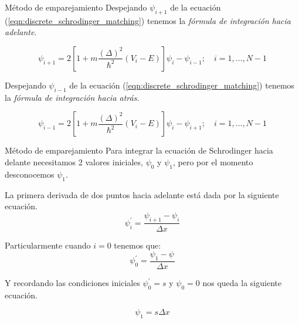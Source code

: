 \begin{frame}{Método de emparejamiento}
    Despejando $\psi_{i+1}$ de la ecuación (\ref{eqn:discrete_schrodinger_matching}) tenemos la \emph{fórmula de integración hacia adelante}.

    \begin{equation}
        \psi_{i+1}
        =
        2\left[
            1+ m\frac{(\Delta)^2}{\hbar^2} (V_i - E) 
        \right] \psi_i - \psi_{i-1}
        ;\quad
        i= 1,...,N-1
        \label{eqn:integracion_adelante_matching}
    \end{equation}

    Despejando $\psi_{i-1}$ de la ecuación (\ref{eqn:discrete_schrodinger_matching}) tenemos la \emph{fórmula de integración hacia atrás}.

    \begin{equation}
        \psi_{i-1}
        =
        2\left[
            1+ m\frac{(\Delta)^2}{\hbar^2} (V_i - E) 
        \right] \psi_i - \psi_{i+1}
        ;\quad
        i= 1,...,N-1
        \label{eqn:integracion_atras_matching}
    \end{equation}

\end{frame}

\begin{frame}{Método de emparejamiento}
    Para integrar la ecuación de Schrodinger hacia delante necesitamos 2 valores iniciales, $\psi_0$ y $\psi_1$, pero por el momento desconocemos $\psi_1$.

    La primera derivada de dos puntos hacia adelante está dada por la siguiente ecuación.
    \begin{equation}
        \psi^{'}_{i} = \frac{\psi_{i+1} - \psi_{i} }{ \Delta x}
    \end{equation}

    Particularmente cuando $i=0$ tenemos que:
    \begin{equation}
        \psi^{'}_{0} = \frac{\psi_{1} - \psi_{} }{ \Delta x}
    \end{equation}

    Y recordando las condiciones iniciales $\psi^{'}_{0}=s$ y $\psi_{0}=0$ nos queda la siguiente ecuación.

    \begin{equation}
        \psi_{1} = s \Delta x
    \end{equation}

\end{frame}



